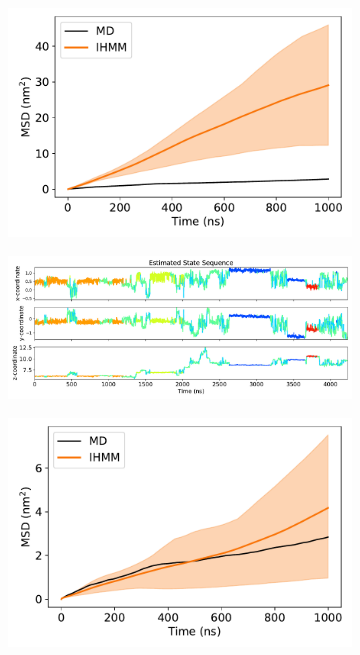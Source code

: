 \documentclass{article}
\begin{document}
  \begin{figure}
  \centering
  \begin{subfigure}{0.35\textwidth}
  \includegraphics[width=\textwidth]{overestimate_ACH_21.pdf}
  \caption{}\label{fig:msd_overestimate}
  \end{subfigure}
  \begin{subfigure}{0.63\textwidth}
  \includegraphics[width=\textwidth]{state_sequence_before_ACH_21.pdf}
  \caption{}\label{fig:state_sequence_before}
  \end{subfigure}
  \begin{subfigure}{0.35\textwidth}
  \includegraphics[width=\textwidth]{msd_improvement_ACH_21.pdf}

\end{subfigure}
\end{figure}
\end{document}
